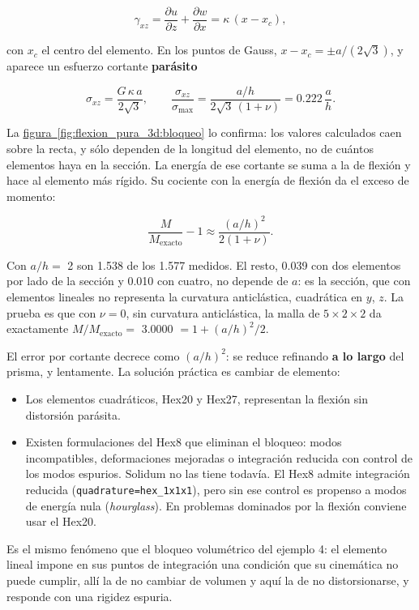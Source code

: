 \documentclass[11pt,oneside]{report}
\begin{document}
\[
\gamma_{xz} = \frac{\partial u}{\partial z} + \frac{\partial w}{\partial x} = \kappa\,(x - x_c),
\]

con $x_c$ el centro del elemento. En los puntos de Gauss, $x - x_c = \pm a/(2\sqrt3)$, y aparece un esfuerzo cortante \textbf{parásito}

\[
\sigma_{xz} = \frac{G\,\kappa\,a}{2\sqrt3},
\qquad
\frac{\sigma_{xz}}{\sigma_{\max}} = \frac{a/h}{2\sqrt3\,(1+\nu)} = 0.222\,\frac{a}{h} .
\]

La \hyperref[fig:flexion_pura_3d:bloqueo]{figura~\ref*{fig:flexion_pura_3d:bloqueo}} lo confirma: los valores calculados caen sobre la recta, y sólo dependen de la longitud del elemento, no de cuántos elementos haya en la sección. La energía de ese cortante se suma a la de flexión y hace al elemento más rígido. Su cociente con la energía de flexión da el exceso de momento:

\[
\frac{M}{M_{\mathrm{exacto}}} - 1 \approx \frac{(a/h)^2}{2(1+\nu)} .
\]

Con $a/h =$ 2 son 1.538 de los 1.577 medidos. El resto, 0.039 con dos elementos por lado de la sección y 0.010 con cuatro, no depende de $a$: es la sección, que con elementos lineales no representa la curvatura anticlástica, cuadrática en $y$, $z$. La prueba es que con $\nu = 0$, sin curvatura anticlástica, la malla de $5 \times 2 \times 2$ da exactamente $M/M_{\mathrm{exacto}} =$ 3.0000 $= 1 + (a/h)^2/2$.

El error por cortante decrece como $(a/h)^2$: se reduce refinando \textbf{a lo largo} del prisma, y lentamente. La solución práctica es cambiar de elemento:

\begin{itemize}
  \item Los elementos cuadráticos, Hex20 y Hex27, representan la flexión sin distorsión parásita.
  \item Existen formulaciones del Hex8 que eliminan el bloqueo: modos incompatibles, deformaciones mejoradas o integración reducida con control de los modos espurios. Solidum no las tiene todavía. El Hex8 admite integración reducida (\texttt{quadrature=\textquotedbl{}hex\_\allowbreak{}1x1x1\textquotedbl{}}), pero sin ese control es propenso a modos de energía nula (\textit{hourglass}). En problemas dominados por la flexión conviene usar el Hex20.
\end{itemize}

Es el mismo fenómeno que el bloqueo volumétrico del ejemplo 4: el elemento lineal impone en sus puntos de integración una condición que su cinemática no puede cumplir, allí la de no cambiar de volumen y aquí la de no distorsionarse, y responde con una rigidez espuria.
\end{document}

